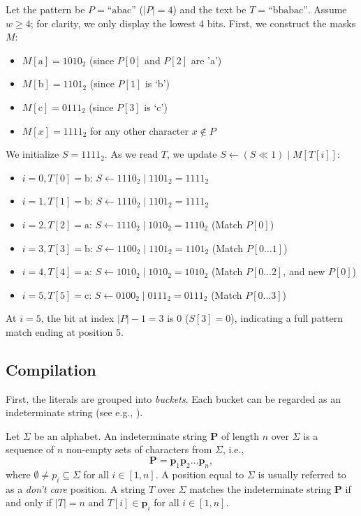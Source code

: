 \begin{example}
  Let the pattern be $P = \text{``abac''}$ ($|P| = 4$) and the text be $T = \text{``bbabac''}$. Assume $w \geq 4$; for clarity, we only display the lowest 4 bits.
  First, we construct the masks $M$:
  \begin{itemize}
    \item $M[\text{a}] = 1010_2$ (since $P[0]$ and $P[2]$ are 'a')
    \item $M[\text{b}] = 1101_2$ (since $P[1]$ is `b')
    \item $M[\text{c}] = 0111_2$ (since $P[3]$ is `c')
    \item $M[x] = 1111_2$ for any other character $x \notin P$
  \end{itemize}

  We initialize $S = 1111_2$. As we read $T$, we update $S \gets (S \ll 1) \mid M[T[i]]$:
  \begin{itemize}
    \item $i=0, T[0]=\text{b}$: $S \gets 1110_2 \mid 1101_2 = 1111_2$
    \item $i=1, T[1]=\text{b}$: $S \gets 1110_2 \mid 1101_2 = 1111_2$
    \item $i=2, T[2]=\text{a}$: $S \gets 1110_2 \mid 1010_2 = 1110_2$ (Match $P[0]$)
    \item $i=3, T[3]=\text{b}$: $S \gets 1100_2 \mid 1101_2 = 1101_2$ (Match $P[0 \dots 1]$)
    \item $i=4, T[4]=\text{a}$: $S \gets 1010_2 \mid 1010_2 = 1010_2$ (Match $P[0 \dots 2]$, and new $P[0]$)
    \item $i=5, T[5]=\text{c}$: $S \gets 0100_2 \mid 0111_2 = 0111_2$ (Match $P[0 \dots 3]$)
  \end{itemize}
  At $i=5$, the bit at index $|P|-1 = 3$ is $0$ ($S[3] = 0$), indicating a full pattern match ending at position 5.
\end{example}

\subsection{Compilation}


First, the literals are grouped into \textit{buckets}. Each bucket can be regarded as an indeterminate string (see e.g., \cite{holub2008fast}).

\begin{definition}
  Let $\Sigma$ be an alphabet. An indeterminate string $\bm{P}$ of length $n$ over $\Sigma$ is a sequence of $n$ non-empty sets of characters from $\Sigma$, i.e.,
  $$\bm{P} = \bm{p}_1  \bm{p}_2  \ldots \bm{p}_{n},$$
  where $\emptyset \neq p_i \subseteq \Sigma$ for all $i \in [1, n]$. A position equal to $\Sigma$ is usually referred to as a \textit{don't care} position. A string $T$ over $\Sigma$ matches the indeterminate string $\bm{P}$ if and only if $|T| = n$ and $T[i] \in \bm{p}_i$ for all $i \in [1, n]$.
\end{definition}

